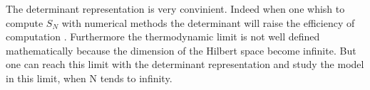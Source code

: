\documentclass[12pt]{article}
\begin{document}
 
 
The determinant representation is very convinient. Indeed when one whish to compute $S_N $ with numerical methods the determinant will raise the efficiency of computation \cite{CauM05}. Furthermore the thermodynamic limit is not well defined mathematically because the dimension of the Hilbert space become infinite. But one can reach this limit with the determinant representation and study the model in this limit, when N tends to infinity\cite{Yan52}. %
  
 



\end{document}
